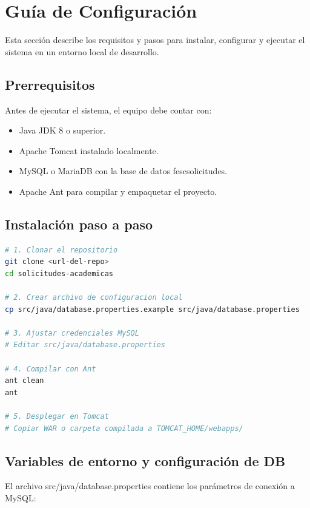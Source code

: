 \documentclass[12pt,letterpaper]{article}
\newcommand{\code}[1]{\texorpdfstring{\begingroup\normalfont\normalsize\def\_{\textunderscore\allowbreak}#1\endgroup}{#1}}
\begin{document}
\section{Guía de Configuración}

Esta sección describe los requisitos y pasos para instalar, configurar y ejecutar el sistema en un entorno local de desarrollo.

\subsection{Prerrequisitos}

Antes de ejecutar el sistema, el equipo debe contar con:

\begin{itemize}
    \item Java JDK 8 o superior.
    \item Apache Tomcat instalado localmente.
    \item MySQL o MariaDB con la base de datos \code{fesc\_solicitudes}.
    \item Apache Ant para compilar y empaquetar el proyecto.
\end{itemize}

\subsection{Instalación paso a paso}

\begin{lstlisting}[language=bash]
# 1. Clonar el repositorio
git clone <url-del-repo>
cd solicitudes-academicas

# 2. Crear archivo de configuracion local
cp src/java/database.properties.example src/java/database.properties

# 3. Ajustar credenciales MySQL
# Editar src/java/database.properties

# 4. Compilar con Ant
ant clean
ant

# 5. Desplegar en Tomcat
# Copiar WAR o carpeta compilada a TOMCAT_HOME/webapps/
\end{lstlisting}

\subsection{Variables de entorno y configuración de DB}

El archivo \code{src/java/database.properties} contiene los parámetros de conexión a MySQL:
\end{document}
